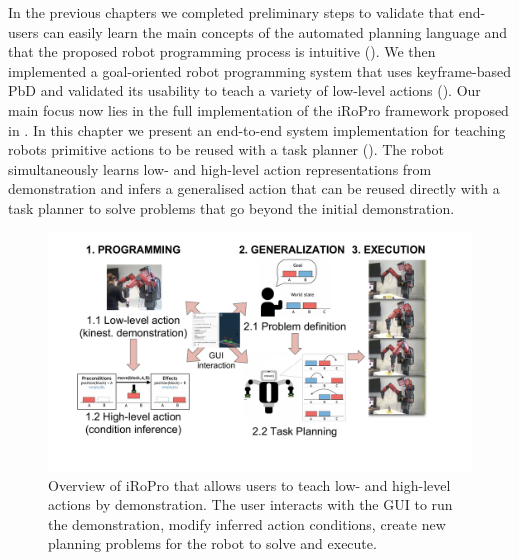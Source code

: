 In the previous chapters we completed preliminary steps to validate that end-users can easily learn the main concepts of the automated planning language and that the proposed robot programming process is intuitive ().
We then implemented a goal-oriented robot programming system that uses keyframe-based PbD and validated its usability to teach a variety of low-level actions ().
Our main focus now lies in the full implementation of the iRoPro framework proposed in .
In this chapter we present an end-to-end system implementation for teaching robots primitive actions to be reused with a task planner ().
The robot simultaneously learns low- and high-level action representations from demonstration and infers a generalised action that can be reused directly with a task planner to solve problems that go beyond the initial demonstration.

\begin{figure}[h]
	\centering
	\includegraphics[width=0.95\linewidth]{figures/overview.pdf}
	\caption{Overview of iRoPro that allows users to teach low- and high-level actions by demonstration. The user interacts with the GUI to run the demonstration, modify inferred action conditions, create new planning problems for the robot to solve and execute.}
	\label{fig:overview}
\end{figure}	

